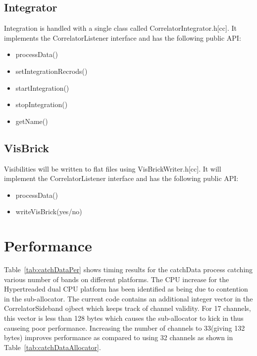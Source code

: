 \documentclass[11pt]{article}
\begin{document}
\subsection{Integrator}
Integration is handled with a single class called CorrelatorIntegrator.h[cc].
It implements the CorrelatorListener interface and has the following public
API:
\begin{itemize}
\item processData()
\item setIntegrationRecrods()
\item startIntegration()
\item stopIntegration()
\item getName()
\end{itemize}

\subsection{VisBrick}
Visibilities will be written to flat files using VisBrickWriter.h[cc].
It will implement the CorrelatorListener interface and has the following
public API:
\begin{itemize}
\item processData()
\item writeVisBrick(yes/no)
\end{itemize}

%
%
\section{Performance}
%
%
Table~\ref{tab:catchDataPer} shows timing results for the catchData process
catching various number of bands on different platforms. The CPU increase
for the Hypertreaded dual CPU platform has been identified as being due
to contention in the sub-allocator. The current code contains an additional
integer vector in the CorrelatorSideband ojbect which keeps track of
channel validity. For 17 channels, this vector is less than 128 bytes which
causes the sub-allocator to kick in thus causeing poor performance. 
Increasing the number of channels to 33(giving 132 bytes) improves performance
as compared to using 32 channels as shown in 
Table~\ref{tab:catchDataAllocator}.
\end{document}

